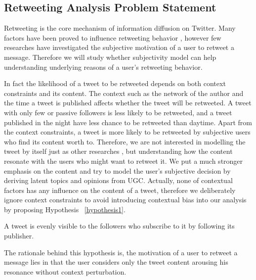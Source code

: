 \documentclass[twocolumn]{svjour3}          %
\begin{document}
\subsection{Retweeting Analysis Problem Statement}
\label{statement}

Retweeting is the core mechanism of information diffusion on Twitter. Many factors have been proved to influence retweeting behavior \cite{Suh2010,conf/icwsm/MacskassyM11,Comarela:2012UFA}, however few researches have investigated the subjective motivation of a user to retweet a message. Therefore we will study whether subjectivity model can help understanding underlying reasons of a user's retweeting behavior.

In fact the likelihood of a tweet to be retweeted depends on both context constraints and its content. 
The context such as the network of the author and the time a tweet is published affects whether the tweet will be retweeted. A tweet with only few or passive followers is less likely to be retweeted, and a tweet published in the night have less chance to be retweeted than daytime. 
Apart from the context constraints, a tweet is more likely to be retweeted by subjective users who find its content worth to. Therefore, we are not interested in modelling the tweet by itself just as other researches \cite{Naveed:2011SMC,2011:NaveedGKC,conf/icwsm/PfitznerGS12}, but understanding how the content resonate with the users who might want to retweet it. 
We put a much stronger emphasis on the content and try to model the user's subjective decision by deriving latent topics and opinions from UGC.  
Actually, none of contextual factors has any influence on the content of a tweet, therefore we deliberately ignore context constraints to avoid introducing contextual bias into our analysis by proposing  Hypothesis ~\ref{hypothesis1}. 
\begin{hypothesis}[H1]
\label{hypothesis1}
A tweet is evenly visible to the followers who subscribe to it by following its publisher.
\end{hypothesis}
The rationale behind this hypothesis is, the motivation of a user to retweet a message lies in that the user considers only the tweet content arousing his resonance without context perturbation.
\end{document}
